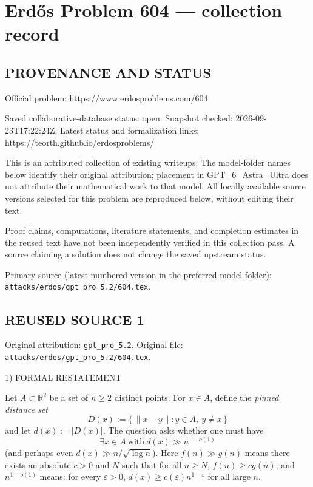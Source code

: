 \section*{Erd\H{o}s Problem 604 --- collection record}

\subsection*{PROVENANCE AND STATUS}
Official problem: https://www.erdosproblems.com/604

Saved collaborative-database status: open.
Snapshot checked: 2026-09-23T17:22:24Z.
Latest status and formalization links: https://teorth.github.io/erdosproblems/

This is an attributed collection of existing writeups. The model-folder names below identify their original attribution; placement in GPT\_6\_Astra\_Ultra does not attribute their mathematical work to that model. All locally available source versions selected for this problem are reproduced below, without editing their text.

Proof claims, computations, literature statements, and completion estimates in the reused text have not been independently verified in this collection pass. A source claiming a solution does not change the saved upstream status.

Primary source (latest numbered version in the preferred model folder): \texttt{attacks/erdos/gpt\_pro\_5.2/604.tex}.

\subsection*{REUSED SOURCE 1}
Original attribution: \texttt{gpt\_pro\_5.2}.
Original file: \texttt{attacks/erdos/gpt\_pro\_5.2/604.tex}.


1) FORMAL RESTATEMENT

Let $A\subset\mathbb R^2$ be a set of $n\ge 2$ distinct points.
For $x\in A$, define the \emph{pinned distance set}
\[
D(x):=\{\,\|x-y\|: y\in A,\ y\neq x\,\}
\]
and let $d(x):=|D(x)|$.
The question asks whether one must have
\[
\exists x\in A\ \text{with}\ d(x)\gg n^{1-o(1)}
\]
(and perhaps even $d(x)\gg n/\sqrt{\log n}$).
Here $f(n)\gg g(n)$ means there exists an absolute $c>0$ and $N$ such that for all $n\ge N$, $f(n)\ge c g(n)$; and $n^{1-o(1)}$ means: for every $\varepsilon>0$, $d(x)\ge c(\varepsilon)n^{1-\varepsilon}$ for all large $n$.


